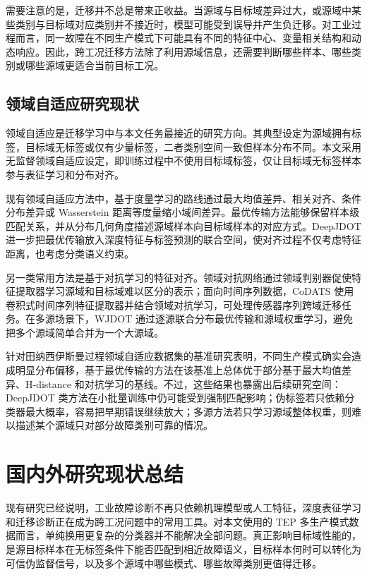\documentclass{seuthesis-2022}
\begin{document}
需要注意的是，迁移并不总是带来正收益。当源域与目标域差异过大，或源域中某些类别与目标域对应类别并不接近时，模型可能受到误导并产生负迁移。对工业过程而言，同一故障在不同生产模式下可能具有不同的特征中心、变量相关结构和动态响应。因此，跨工况迁移方法除了利用源域信息，还需要判断哪些样本、哪些类别或哪些源域更适合当前目标工况。

\subsection{领域自适应研究现状}

领域自适应是迁移学习中与本文任务最接近的研究方向。其典型设定为源域拥有标签，目标域无标签或仅有少量标签，二者类别空间一致但样本分布不同。本文采用无监督领域自适应设定，即训练过程中不使用目标域标签，仅让目标域无标签样本参与表征学习和分布对齐。

现有领域自适应方法中，基于度量学习的路线通过最大均值差异、相关对齐、条件分布差异或 Wasserstein 距离等度量缩小域间差异。最优传输方法能够保留样本级匹配关系，并从分布几何角度描述源域样本向目标域样本的对应方式\cite{courty2017otda}。DeepJDOT 进一步把最优传输放入深度特征与标签预测的联合空间，使对齐过程不仅考虑特征距离，也考虑分类语义约束\cite{damodaran2018deepjdot}。

另一类常用方法是基于对抗学习的特征对齐。领域对抗网络通过领域判别器促使特征提取器学习源域和目标域难以区分的表示；面向时间序列数据，CoDATS 使用卷积式时间序列特征提取器并结合领域对抗学习，可处理传感器序列跨域迁移任务\cite{wilson2020codats}。在多源场景下，WJDOT 通过逐源联合分布最优传输和源域权重学习，避免把多个源域简单合并为一个大源域\cite{turrisi2022wjdot}。

针对田纳西伊斯曼过程领域自适应数据集的基准研究表明，不同生产模式确实会造成明显分布偏移，基于最优传输的方法在该基准上总体优于部分基于最大均值差异、H-distance 和对抗学习的基线\cite{montesuma2024benchmark}。不过，这些结果也暴露出后续研究空间：DeepJDOT 类方法在小批量训练中仍可能受到强制匹配影响；伪标签若只依赖分类器最大概率，容易把早期错误继续放大；多源方法若只学习源域整体权重，则难以描述某个源域只对部分故障类别可靠的情况。

\section{国内外研究现状总结}

现有研究已经说明，工业故障诊断不再只依赖机理模型或人工特征，深度表征学习和迁移诊断正在成为跨工况问题中的常用工具。对本文使用的 TEP 多生产模式数据而言，单纯换用更复杂的分类器并不能解决全部问题。真正影响目标域性能的，是源目标样本在无标签条件下能否匹配到相近故障语义，目标样本何时可以转化为可信伪监督信号，以及多个源域中哪些模式、哪些故障类别更值得迁移。
\end{document}
